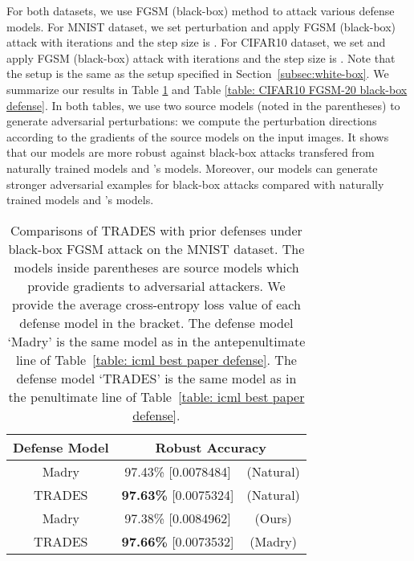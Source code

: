 \documentclass[11pt]{article}
\newcommand{\0}{\mathbf{0}}
\newcommand{\1}{\mathbf{1}}
\begin{document}
For both datasets, we use FGSM (black-box) method to attack various defense models. For MNIST dataset, we set perturbation  and apply FGSM (black-box) attack with  iterations and the step size is . For CIFAR10 dataset, we set  and apply FGSM (black-box) attack with  iterations and the step size is . Note that the setup is the same as the setup specified in Section~\ref{subsec:white-box}. We summarize our results in Table \ref{table: MNIST FGSM-40 black-box defense} and Table \ref{table: CIFAR10 FGSM-20 black-box defense}. In both tables, we use two source models (noted in the parentheses) to generate adversarial perturbations: we compute the perturbation directions according to the gradients of the source models on the input images. It shows that our models are more robust against black-box attacks transfered from naturally trained models and \cite{madry2018towards}'s models. Moreover, our models can generate stronger adversarial examples for black-box attacks compared with naturally trained models and \cite{madry2018towards}'s models.


\begin{table}
	\caption{Comparisons of TRADES with prior defenses under black-box FGSM attack on the MNIST dataset. The models inside parentheses are source models which provide gradients to adversarial attackers. We provide the average cross-entropy loss value  of each defense model in the bracket. The defense model `Madry' is the same model as in the antepenultimate line of Table~\ref{table: icml best paper defense}. The defense model `TRADES' is the same model as in the penultimate line of Table~\ref{table: icml best paper defense}.}
	\vspace{+0.2cm}
	\label{table: MNIST FGSM-40 black-box defense}
	\centering
\begin{tabular}{c||cc}\hline
		Defense Model & \multicolumn{2}{c}{Robust Accuracy }
		\\
		\hline
		{Madry} & 97.43\% [0.0078484]  & (Natural)   
		\\ 
		\hline
		{TRADES} & \textbf{97.63\%} [0.0075324] &  (Natural)
		\\
		\hline
		{Madry} & 97.38\%  [0.0084962] & (Ours) \\ 
		\hline
		{TRADES} &  \textbf{97.66\%}  [0.0073532] &  (Madry)  
		\\
		\hline
	\end{tabular}
\end{table}
\end{document}
